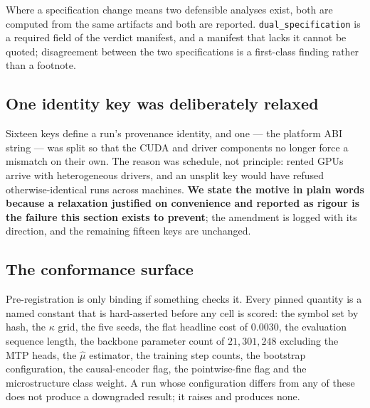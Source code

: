 Where a specification change means two defensible analyses exist, both are computed from the same
artifacts and both are reported. \texttt{dual\_specification} is a required field of the verdict
manifest, and a manifest that lacks it cannot be quoted; disagreement between the two
specifications is a first-class finding rather than a footnote.

\subsection{One identity key was deliberately relaxed}
\label{sec:repro-abi}

Sixteen keys define a run's provenance identity, and one --- the platform ABI string --- was split
so that the CUDA and driver components no longer force a mismatch on their own. The reason was
schedule, not principle: rented GPUs arrive with heterogeneous drivers, and an unsplit key would
have refused otherwise-identical runs across machines. \textbf{We state the motive in plain words
because a relaxation justified on convenience and reported as rigour is the failure this section
exists to prevent}; the amendment is logged with its direction, and the remaining fifteen keys are
unchanged.

\subsection{The conformance surface}
\label{sec:repro-conformance}

Pre-registration is only binding if something checks it. Every pinned quantity is a named constant
that is hard-asserted before any cell is scored: the symbol set by hash, the $\kappa$ grid, the
five seeds, the flat headline cost of $0.0030$, the evaluation sequence length, the backbone
parameter count of $21{,}301{,}248$ excluding the MTP heads, the $\hat{\mu}$ estimator, the
training step counts,
the bootstrap configuration, the causal-encoder flag, the pointwise-fine flag and the
microstructure class weight. A run whose configuration differs from any of these does not produce a
downgraded result; it raises and produces none.

